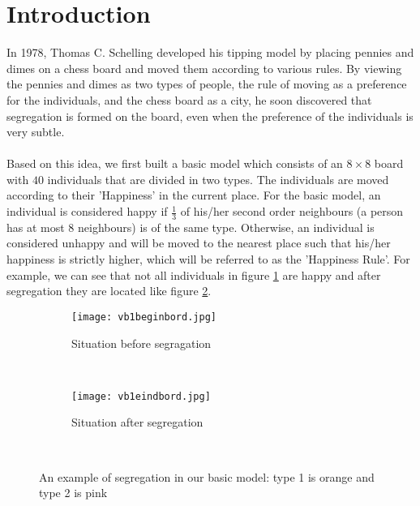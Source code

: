 \section{Introduction}
In 1978, Thomas C. Schelling developed his tipping model by placing pennies and dimes on a chess board and moved them according to various rules. 
By viewing the pennies and dimes as two types of people, the rule of moving as a preference for the individuals, and the chess board as a city, he soon discovered that segregation is formed on the board, even when the preference of the individuals is very subtle.\\
\\
Based on this idea, we first built a basic model which consists of an $8\times8$ board with $40$ individuals that are divided in two types. 
The individuals are moved according to their 'Happiness' in the current place. 
For the basic model, an individual is considered happy if $\frac{1}{3}$ of his/her second order neighbours (a person has at most $8$ neighbours) is of the same type. 
Otherwise, an individual is considered unhappy and will be moved to the nearest place such that his/her happiness is strictly higher, which will be referred to as the 'Happiness Rule'. 
For example, we can see that not all individuals in figure \ref{fig:ebmb} are happy and after segregation they are located like figure \ref{fig:ebme}.

\begin{figure}[H]
	\centering
    \begin{subfigure}{0.45\textwidth}
        \texttt{[image: vb1beginbord.jpg]}
        \caption{Situation before segragation}
        \label{fig:ebmb}
    \end{subfigure}\hspace{0cm}
    ~ %
    \begin{subfigure}{0.45\textwidth}
        \texttt{[image: vb1eindbord.jpg]}
        \caption{Situation after segregation}
        \label{fig:ebme}
    \end{subfigure}
    ~ %
    \caption{An example of segregation in our basic model: type 1 is orange and type 2 is pink}
    \label{fig:example basic model}
\end{figure}

